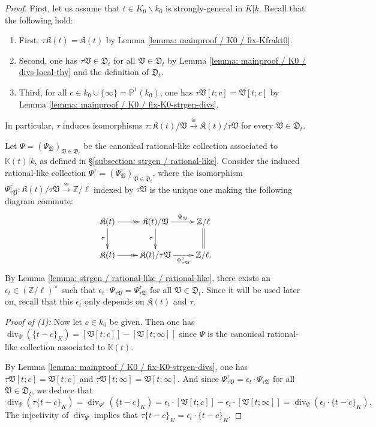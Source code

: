 \documentclass[11pt]{amsart}
\theoremstyle{definition}
\theoremstyle{remark}
\numberwithin{equation}{section}
\DeclareMathOperator{\divv}{div}
\newcommand{\Z}{\mathbb{Z}}
\newcommand{\Pbb}{\mathbb{P}}
\newcommand{\Kbb}{\mathbb{K}}
\newcommand{\Kfrak}{\mathfrak{K}}
\newcommand{\Dfrak}{\mathfrak{D}}
\newcommand{\Vfrak}{\mathfrak{V}}
\begin{document}
\begin{proof}
  First, let us assume that $t \in K_0\smallsetminus k_0$ is strongly-general in $K|k$.
  Recall that the following hold:
  \begin{enumerate}
    \item First, $\tau \Kfrak(t) = \Kfrak(t)$ by Lemma \ref{lemma: mainproof / K0 / fix-Kfrakt0}.
    \item Second, one has $\tau \Vfrak \in \Dfrak_t$ for all $\Vfrak \in \Dfrak_t$ by Lemma \ref{lemma: mainproof / K0 / divs-local-thy} and the definition of $\Dfrak_t$.
    \item Third, for all $c \in k_0 \cup \{\infty\} = \Pbb^1(k_0)$, one has $\tau\Vfrak[t;c] = \Vfrak[t;c]$ by Lemma \ref{lemma: mainproof / K0 / fix-K0-strgen-divs}.
  \end{enumerate}
  In particular, $\tau$ induces isomorphisms $\tau : \Kfrak(t)/\Vfrak \xrightarrow{\cong} \Kfrak(t)/\tau\Vfrak$ for every $\Vfrak \in \Dfrak_t$.

  Let $\Psi = (\Psi_\Vfrak)_{\Vfrak \in \Dfrak_t}$ be the canonical rational-like collection associated to $\Kbb(t)|k$, as defined in \S\ref{subsection: strgen / rational-like}.
  Consider the induced rational-like collection $\Psi^\tau = (\Psi^\tau_{\Vfrak})_{\Vfrak \in \Dfrak_t}$, where the isomorphism $\Psi^\tau_{\tau\Vfrak} : \Kfrak(t)/\tau\Vfrak \xrightarrow{\cong}\Z/\ell$ indexed by $\tau\Vfrak$ is the unique one making the following diagram commute:
  \[
  \xymatrix{
    \Kfrak(t) \ar[d]_\tau \ar@{->>}[r] & \Kfrak(t)/\Vfrak \ar[d]_\tau \ar[r]^-{\Psi_\Vfrak} & \Z/\ell \ar@{=}[d] \\
    \Kfrak(t) \ar@{->>}[r] & \Kfrak(t)/\tau\Vfrak \ar[r]_-{\Psi^\tau_{\tau\Vfrak}} & \Z/\ell.
  }
  \]
  By Lemma \ref{lemma: strgen / rational-like / rational-like}, there exists an $\epsilon_t \in (\Z/\ell)^\times$ such that $\epsilon_t \cdot \Psi_{\tau\Vfrak} = \Psi^\tau_{\tau\Vfrak}$ for all $\Vfrak \in \Dfrak_t$.
  Since it will be used later on, recall that this $\epsilon_t$ only depends on $\Kfrak(t)$ and $\tau$.
  
  \vskip 5pt
  \noindent\emph{Proof of (1):} 
  Now let $c \in k_0$ be given.
  Then one has $\divv_\Psi(\{t-c\}_K) = [\Vfrak[t;c]] - [\Vfrak[t;\infty]]$ since $\Psi$ is the canonical rational-like collection associated to $\Kbb(t)$.
  
  By Lemma \ref{lemma: mainproof / K0 / fix-K0-strgen-divs}, one has $\tau\Vfrak[t;c] = \Vfrak[t;c]$ and $\tau\Vfrak[t;\infty] = \Vfrak[t;\infty]$.
  And since $\Psi^\tau_{\tau\Vfrak} = \epsilon_t \cdot \Psi_{\tau\Vfrak}$ for all $\Vfrak \in \Dfrak_t$, we deduce that
  \[ \divv_\Psi(\tau\{t-c\}_K) = \divv_{\Psi^\tau}(\{t-c\}_K) = \epsilon_t \cdot [\Vfrak[t;c]] - \epsilon_t \cdot [\Vfrak[t;\infty]] = \divv_\Psi(\epsilon_t \cdot \{t-c\}_K). \]
  The injectivity of $\divv_\Psi$ implies that $\tau\{t-c\}_K = \epsilon_t \cdot \{t-c\}_K$.


\end{proof}
\end{document}
